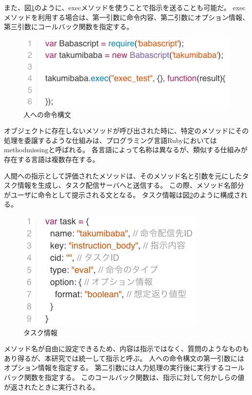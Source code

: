 また、図\ref{fig:babascript_exec_method}のように、execメソッドを使うことで指示を送ることも可能だ。
execメソッドを利用する場合は、第一引数に命令内容、第二引数にオプション情報、第三引数にコールバック関数を指定する。

\begin{figure}[htbp]
  \begin{center}
  \includegraphics[width=.8\linewidth,bb=0 0 577 330]{images/babascript_exec_method.js.png}
  \end{center}
  \caption{人への命令構文}
  \label{fig:babascript_exec_method}
\end{figure}

オブジェクトに存在しないメソッドが呼び出された時に、特定のメソッドにその処理を委譲するような仕組みは、プログラミング言語Rubyにおいては
methodmissingと呼ばれる。
各言語によって名称は異なるが、類似する仕組みが存在する言語は複数存在する。

人間への指示として評価されたメソッドは、そのメソッド名と引数を元にしたタスク情報を生成し、タスク配信サーバへと送信する。
この際、メソッド名部分がユーザに命令として提示される文となる。
タスク情報は図\ref{fig:task_format}のように構成される。

\begin{figure}[htbp]
  \begin{center}
  \includegraphics[width=.6\linewidth,bb=0 0 354 225]{images/task_format.js.png}
  \end{center}
  \caption{タスク情報}
  \label{fig:task_format}
\end{figure}

メソッド名が自由に設定できるため、内容は指示ではなく、質問のようなものもあり得るが、本研究では統一して指示と呼ぶ。
人への命令構文の第一引数にはオプション情報を指定する。
第二引数には人力処理の実行後に実行するコールバック関数を指定する。
このコールバック関数は、指示に対して何かしらの値が返されたときに実行される。

